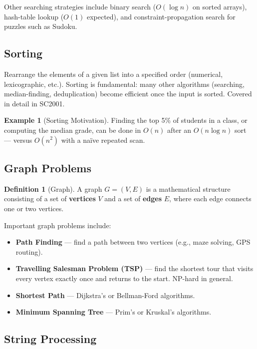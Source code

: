 \documentclass[11pt, a4paper, notitlepage]{report}
\theoremstyle{definition}
\newtheorem{definition}[theorem]{Definition}
\theoremstyle{remark}
\theoremstyle{definition}
\newtheorem{example}[theorem]{Example}
\begin{document}
Other searching strategies include binary search ($O(\log n)$ on sorted arrays), hash-table
lookup ($O(1)$ expected), and constraint-propagation search for puzzles such as Sudoku.

\subsection{Sorting}
\label{subsec:sorting}

Rearrange the elements of a given list into a specified order (numerical, lexicographic, etc.).
Sorting is fundamental: many other algorithms (searching, median-finding, deduplication) become
efficient once the input is sorted.  Covered in detail in SC2001.

\begin{example}[Sorting Motivation]
\label{ex:sorting-motivation}
Finding the top 5\% of students in a class, or computing the median grade, can be done in
$O(n)$ after an $O(n \log n)$ sort --- versus $O(n^2)$ with a na\"ive repeated scan.
\end{example}

\subsection{Graph Problems}
\label{subsec:graph-problems}

\begin{definition}[Graph]
\label{def:graph}
A graph $G = (V, E)$ is a mathematical structure consisting of a set of \textbf{vertices} $V$
and a set of \textbf{edges} $E$, where each edge connects one or two vertices.
\end{definition}

Important graph problems include:
\begin{itemize}
  \item \textbf{Path Finding} --- find a path between two vertices (e.g., maze solving, GPS
        routing).
  \item \textbf{Travelling Salesman Problem (TSP)} --- find the shortest tour that visits
        every vertex exactly once and returns to the start.  NP-hard in general.
  \item \textbf{Shortest Path} --- Dijkstra's or Bellman-Ford algorithms.
  \item \textbf{Minimum Spanning Tree} --- Prim's or Kruskal's algorithms.
\end{itemize}

\subsection{String Processing}
\label{subsec:string-processing}
\end{document}
